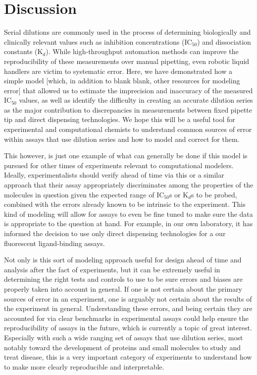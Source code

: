 \documentclass[aps,pre,twocolumn,nofootinbib,superscriptaddress,linenumbers]{revtex4-1}
\begin{document}
\section{Discussion}

Serial dilutions are commonly used in the process of determining biologically and clinically relevant values such as inhibition concentrations (IC$_{ 50}$)  and dissociation constants (K$_{d}$). 
While high-throughput automation methods can improve the reproducibility of these measurements over manual pipetting, even robotic liquid handlers are victim to systematic error. 
Here, we have demonstrated how a simple model {\color{red} [which, in addition to blank blank, other resources for modeling error]} that allowed us to estimate the imprecision and inaccuracy of the measured IC$_{50}$ values, as well as identify the difficulty in creating an accurate dilution series as the major contribution to discrepancies in measurements between fixed pipette tip and direct dispensing technologies. 
We hope this will be a useful tool for experimental and computational chemists to understand common sources of error within assays that use dilution series and how to model and correct for them.

This however, is just one example of what can generally be done if this model is pursued for other times of experiments relevant to computational modelers.
Ideally, experimentalists should verify ahead of time via this or a similar approach that their assay appropriately discriminates among the properties of the molecules in question given the expected range of IC$_{ 50}$s or K$_{d}$s to be probed, combined with the errors already known to be intrinsic to the experiment. 
This kind of modeling will allow for assays to even be fine tuned to make sure the data is appropriate to the question at hand. 
For example, in our own laboratory, it has informed the decision to use only direct dispensing technologies for a our fluorescent ligand-binding assays.

Not only is this sort of modeling approach useful for design ahead of time and analysis after the fact of experiments, but it can be extremely useful in determining the right tests and controls to use to be sure errors and biases are properly taken into account in general. If one is not certain about the primary sources of error in an experiment, one is arguably not certain about the results of the experiment in general. 
Understanding these errors, and being certain they are accounted for via clear benchmarks in experimental assays could help ensure the reproducibility of assays in the future, which is currently a topic of great interest. 
Especially with such a wide ranging set of assays that use dilution series, most notably toward the development of proteins and small molecules to study and treat disease, this is a very important category of experiments to understand how to make more clearly reproducible and interpretable.
\end{document}
